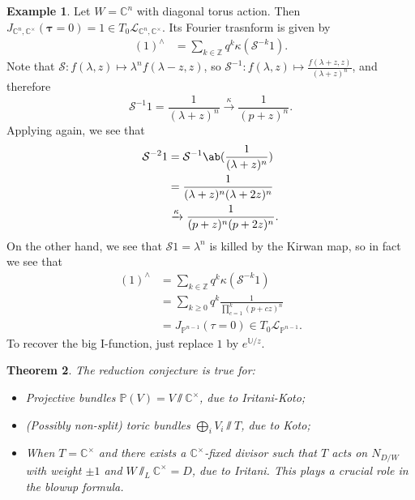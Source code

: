 \documentclass{amsart}
\newtheorem{thm}{Theorem}[section]
\theoremstyle{definition}
\newtheorem{exm}[thm]{Example}
\theoremstyle{remark}
\theoremstyle{plain}
\theoremstyle{definition}
\theoremstyle{remark}
\newcommand{\C}{\mathbb{C}}
\newcommand{\Z}{\mathbb{Z}}
\renewcommand{\P}{\mathbb{P}}
\renewcommand{\mc}[1]{\mathcal{#1}}
\newcommand{\btau}{\symbf{\tau}}
\newcommand{\1}{\mathbf{1}}
\newcommand{\2}{\mathbf{2}}
\newcommand{\3}{\mathbf{3}}
\begin{document}
\begin{exm}
    Let \(W = \C^n\) with diagonal torus action. Then \(J_{\C^n, \C^{\times}}(\btau = 0) = 1 \in T_0 \mc{L}_{\C^n, \C^{\times}}\). Its Fourier trasnform is given by 
    \begin{align*}
        (1)^{\wedge} &= \sum_{k \in \Z} q^k \kappa(\mc{S}^{-k} 1).
    \end{align*}
    Note that \(\mc{S} \colon f(\lambda, z) \mapsto \lambda^n f(\lambda - z, z)\), so \(\mc{S}^{-1} \colon f(\lambda, z) \mapsto \frac{f(\lambda + z, z)}{(\lambda + z)^n}\), and therefore
    \[ \mc{S}^{-1} 1 = \frac{1}{(\lambda + z)^n} \xrightarrow{\kappa} \frac{1}{(p+z)^n}. \]
    Applying again, we see that
    \begin{align*}
        \mc{S}^{-2} 1 &= \mc{S}^{-1} \ab(\frac{1}{(\lambda + z)^n}) \\
        &= \frac{1}{(\lambda+z)^n (\lambda + 2z)^n} \\
        &\xrightarrow{\kappa} \frac{1}{(p+z)^n (p+2z)^n}.
    \end{align*}
    On the other hand, we see that \(\mc{S} 1 = \lambda^n\) is killed by the Kirwan map, so in fact we see that
    \begin{align*}
        (1)^{\wedge} &= \sum_{k \in \Z} q^k \kappa(\mc{S}^{-k} 1) \\
        &= \sum_{k \geq 0} q^k \frac{1}{\prod_{c=1}^k (p+cz)^n} \\
        &= J_{\P^{n-1}}(\tau = 0) \in T_0 \mc{L}_{\P^{n-1}}.
    \end{align*}
    To recover the big I-function, just replace \(1\) by \(e^{\mathbb{U}/z}\).
\end{exm}

\begin{thm}
    The reduction conjecture is true for:
    \begin{itemize}
        \item Projective bundles \(\P(V) = V \sslash \C^{\times}\), due to Iritani-Koto;
        \item (Possibly non-split) toric bundles \(\bigoplus_i V_i \sslash T\), due to Koto;
        \item When \(T = \C^{\times}\) and there exists a \(\C^{\times}\)-fixed divisor such that \(T\) acts on \(N_{D/W}\) with weight \(\pm 1\) and \(W \sslash_L \C^{\times} = D\), due to Iritani. This plays a crucial role in the blowup formula.
    \end{itemize}
\end{thm}
\end{document}
